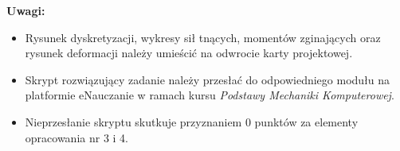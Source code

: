 \documentclass[a4paper,10pt]{article}
\begin{document}
    \vspace{5mm}

    \noindent\textbf{Uwagi:}
    \begin{itemize}
    \item Rysunek dyskretyzacji, wykresy sił tnących, momentów zginających oraz rysunek deformacji należy umieścić na odwrocie karty projektowej.
    \item Skrypt rozwiązujący zadanie należy przesłać do odpowiedniego modułu na platformie eNauczanie w ramach kursu \textit{Podstawy Mechaniki Komputerowej}.
    \item Nieprzesłanie skryptu skutkuje przyznaniem 0 punktów za elementy opracowania nr 3 i 4.
    \end{itemize}
\end{document}
